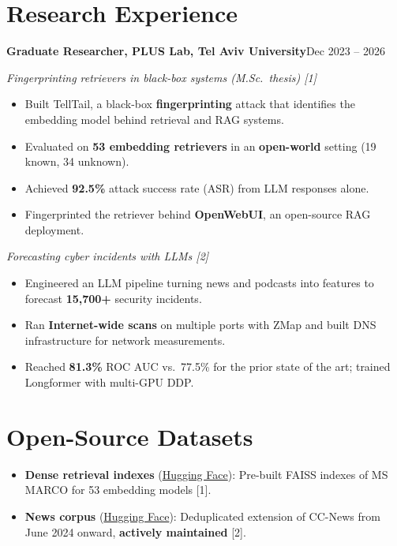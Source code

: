 \documentclass[10pt,letterpaper]{article}
\newcommand{\entry}[4]{%
  \textbf{#1}\hfill #2%
  \if\relax\detokenize{#3}\relax\else\\\textit{#3}\hfill\textit{#4}\fi\par\vspace{2pt}}
\newcommand{\sub}[1]{\textit{\color{maroon!85!black}#1}\par\vspace{1pt}}
\begin{document}
\section{Research Experience}
\entry{Graduate Researcher, PLUS Lab, Tel Aviv University}{Dec 2023 -- 2026}{}{}
\sub{Fingerprinting retrievers in black-box systems (M.Sc.\ thesis) [1]}
\begin{itemize}
  \item Built TellTail, a black-box \textbf{fingerprinting} attack that identifies the embedding model behind retrieval and RAG systems.
  \item Evaluated on \textbf{53 embedding retrievers} in an \textbf{open-world} setting (19 known, 34 unknown).
  \item Achieved \textbf{92.5\%} attack success rate (ASR) from LLM responses alone.
  \item Fingerprinted the retriever behind \textbf{OpenWebUI}, an open-source RAG deployment.
\end{itemize}
\sub{Forecasting cyber incidents with LLMs [2]}
\begin{itemize}
  \item Engineered an LLM pipeline turning news and podcasts into features to forecast \textbf{15,700+} security incidents.
  \item Ran \textbf{Internet-wide scans} on multiple ports with ZMap and built DNS infrastructure for network measurements.
  \item Reached \textbf{81.3\%} ROC AUC vs.\ 77.5\% for the prior state of the art; trained Longformer with multi-GPU DDP.
\end{itemize}

\section{Open-Source Datasets}
\begin{itemize}[label={}, leftmargin=0pt]
  \item \textbf{Dense retrieval indexes} (\href{https://huggingface.co/datasets/AbedGarra/msmarco-indexes}{\color{maroon}Hugging Face}): Pre-built FAISS indexes of MS MARCO for 53 embedding models [1].
  \item \textbf{News corpus} (\href{https://huggingface.co/datasets/AbedGarra/ccnews2024plus}{\color{maroon}Hugging Face}): Deduplicated extension of CC-News from June 2024 onward, \textbf{actively maintained} [2].
\end{itemize}
\end{document}
